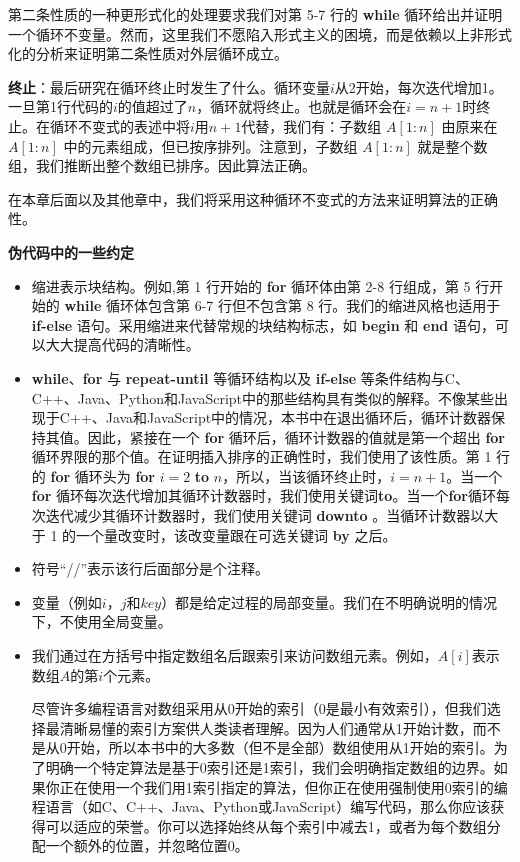 \documentclass[lang=cn,newtx,10pt,scheme=chinese]{elegantbook}
\begin{document}
第二条性质的一种更形式化的处理要求我们对第 5-7 行的 \textbf{while} 循环给出并证明一个循环不变量。然而，这里我们不愿陷入形式主义的困境，而是依赖以上非形式化的分析来证明第二条性质对外层循环成立。

\textbf{终止}：最后研究在循环终止时发生了什么。循环变量$i$从2开始，每次迭代增加1。一旦第1行代码的$i$的值超过了$n$，循环就将终止。也就是循环会在$i=n+1$时终止。在循环不变式的表述中将$i$用$n+1$代替，我们有：子数组 $A[1:n]$ 由原来在 $A[1:n]$ 中的元素组成，但已按序排列。注意到，子数组 $A[1:n]$ 就是整个数组，我们推断出整个数组已排序。因此算法正确。

在本章后面以及其他章中，我们将采用这种循环不变式的方法来证明算法的正确性。

\textbf{伪代码中的一些约定}

\begin{itemize}
    \item 缩进表示块结构。例如,第 1 行开始的 \textbf{for} 循环体由第 2-8 行组成，第 5 行开始的 \textbf{while} 循环体包含第 6-7 行但不包含第 8 行。我们的缩进风格也适用于 \textbf{if-else} 语句。采用缩进来代替常规的块结构标志，如 \textbf{begin} 和 \textbf{end} 语句，可以大大提高代码的清晰性。
    \item \textbf{while}、\textbf{for} 与 \textbf{repeat-until} 等循环结构以及 \textbf{if-else} 等条件结构与C、C++、Java、Python和JavaScript中的那些结构具有类似的解释。不像某些出现于C++、Java和JavaScript中的情况，本书中在退出循环后，循环计数器保持其值。因此，紧接在一个 \textbf{for} 循环后，循环计数器的值就是第一个超出 \textbf{for} 循环界限的那个值。在证明插入排序的正确性时，我们使用了该性质。第 1 行的 \textbf{for} 循环头为 \textbf{for} $i=2$ \textbf{to} $n$，所以，当该循环终止时，$i=n+1$。当一个 \textbf{for} 循环每次迭代增加其循环计数器时，我们使用关键词\textbf{to}。当一个\textbf{for}循环每次迭代减少其循环计数器时，我们使用关键词 \textbf{downto} 。当循环计数器以大于 1 的一个量改变时，该改变量跟在可选关键词 \textbf{by} 之后。
    \item 符号``//''表示该行后面部分是个注释。
    \item 变量（例如$i$，$j$和$key$）都是给定过程的局部变量。我们在不明确说明的情况下，不使用全局变量。
    \item 我们通过在方括号中指定数组名后跟索引来访问数组元素。例如，$A[i]$表示数组$A$的第$i$个元素。

    尽管许多编程语言对数组采用从0开始的索引（0是最小有效索引），但我们选择最清晰易懂的索引方案供人类读者理解。因为人们通常从1开始计数，而不是从0开始，所以本书中的大多数（但不是全部）数组使用从1开始的索引。为了明确一个特定算法是基于0索引还是1索引，我们会明确指定数组的边界。如果你正在使用一个我们用1索引指定的算法，但你正在使用强制使用0索引的编程语言（如C、C++、Java、Python或JavaScript）编写代码，那么你应该获得可以适应的荣誉。你可以选择始终从每个索引中减去1，或者为每个数组分配一个额外的位置，并忽略位置0。
    

\end{itemize}
\end{document}
